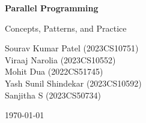 \begin{titlepage}
  \centering
  \vspace*{1.2in}
  {\Huge\bfseries Parallel Programming\par}
  \vspace{0.2in}
  {\Large Concepts, Patterns, and Practice\par}
  \vspace{0.8in}
  {\large
    Sourav Kumar Patel (2023CS10751)\\[0.15em]
    Viraaj Narolia (2023CS10552)\\[0.15em]
    Mohit Dua (2022CS51745)\\[0.15em]
    Yash Sunil Shindekar (2023CS10592)\\[0.15em]
    Sanjitha S (2023CS50734)\par}
  \vfill
  {\large \today\par}
\end{titlepage}

